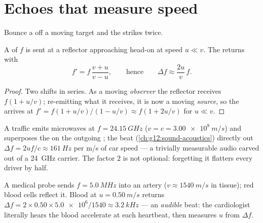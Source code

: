 \section{Echoes that measure speed}

Bounce a  off a moving target and the  strikes twice.

\begin{proposition}\label{prop:g12:doppler-effect:double}
A  of  $f$ is sent at a reflector approaching head-on at speed $u \ll v$.
The  returns with
\[ f' = f\,\frac{v + u}{v - u}, \qquad \text{hence} \qquad \Delta f \approx \frac{2u}{v}\,f . \]
\end{proposition}

\begin{proof}
Two shifts in series. As a moving \emph{observer} the reflector receives $f(1 + u/v)$;
re-emitting what it receives, it is now a moving \emph{source}, so the  arrives at
$f' = f(1 + u/v)/(1 - u/v) \approx f(1 + 2u/v)$ for $u \ll v$.
\end{proof}

\begin{example}\label{ex:g12:doppler-effect:radar}
A traffic  emits microwaves at $f = \qty{24.15}{GHz}$ ($v = c = \qty{3.00e8}{m/s}$)
and superposes the  on the outgoing ; the beat (\cref{ch:g12:sound-acoustics})
directly  out $\Delta f = 2uf/c \approx \qty{161}{Hz}$ per \unit{m/s} of car speed
--- a trivially measurable audio  carved out of a \qty{24}{GHz} carrier. The
factor $2$ is not optional: forgetting it flatters every driver by half.
\end{example}

\begin{example}\label{ex:g12:doppler-effect:ultrasound}
A medical probe sends $f = \qty{5.0}{MHz}$  into an artery
($v \approx \qty{1540}{m/s}$ in tissue); red blood cells reflect it. Blood at
$u = \qty{0.50}{m/s}$ returns $\Delta f = 2 \times 0.50 \times \num{5.0e6}/1540 \approx
\qty{3.2}{kHz}$ --- an \emph{audible} beat: the cardiologist literally hears the blood
accelerate at each heartbeat, then measures $u$ from $\Delta f$.
\end{example}

